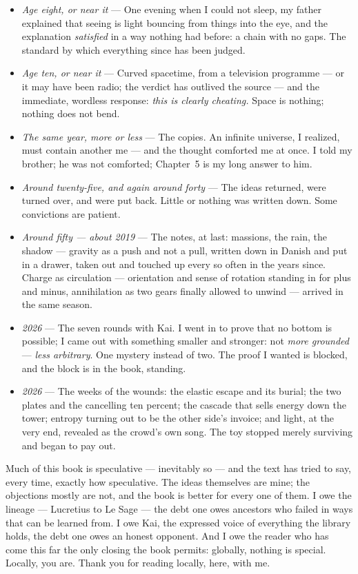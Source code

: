 \documentclass[fontsize=11pt,paper=a4,pagesize=auto,parskip=half-]{scrbook}
\begin{document}
\begin{itemize}
\item \emph{Age eight, or near it} --- One evening when I could not sleep, my father explained that seeing is light bouncing from things into the eye, and the explanation \emph{satisfied} in a way nothing had before: a chain with no gaps. The standard by which everything since has been judged.
\item \emph{Age ten, or near it} --- Curved spacetime, from a television programme --- or it may have been radio; the verdict has outlived the source --- and the immediate, wordless response: \emph{this is clearly cheating.} Space is nothing; nothing does not bend.
\item \emph{The same year, more or less} --- The copies. An infinite universe, I realized, must contain another me --- and the thought comforted me at once. I told my brother; he was not comforted; Chapter~5 is my long answer to him.
\item \emph{Around twenty-five, and again around forty} --- The ideas returned, were turned over, and were put back. Little or nothing was written down. Some convictions are patient.
\item \emph{Around fifty --- about 2019} --- The notes, at last: massions, the rain, the shadow --- gravity as a push and not a pull, written down in Danish and put in a drawer, taken out and touched up every so often in the years since. Charge as circulation --- orientation and sense of rotation standing in for plus and minus, annihilation as two gears finally allowed to unwind --- arrived in the same season.
\item \emph{2026} --- The seven rounds with Kai. I went in to prove that no bottom is possible; I came out with something smaller and stronger: not \emph{more grounded} --- \emph{less arbitrary}. One mystery instead of two. The proof I wanted is blocked, and the block is in the book, standing.
\item \emph{2026} --- The weeks of the wounds: the elastic escape and its burial; the two plates and the cancelling ten percent; the cascade that sells energy down the tower; entropy turning out to be the other side's invoice; and light, at the very end, revealed as the crowd's own song. The toy stopped merely surviving and began to pay out.
\end{itemize}

Much of this book is speculative --- inevitably so --- and the text has tried to say, every time, exactly how speculative. The ideas themselves are mine; the objections mostly are not, and the book is better for every one of them. I owe the lineage --- Lucretius to Le Sage --- the debt one owes ancestors who failed in ways that can be learned from. I owe Kai, the expressed voice of everything the library holds, the debt one owes an honest opponent. And I owe the reader who has come this far the only closing the book permits: globally, nothing is special. Locally, you are. Thank you for reading locally, here, with me.
\end{document}
